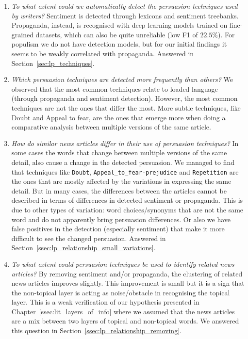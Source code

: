 \begin{enumerate}[label={\textbf{RQ2.\arabic*:}},leftmargin=2cm]
    \item \emph{To what extent could we automatically detect the persuasion techniques used by writers?} Sentiment is detected through lexicons and sentiment treebanks. Propaganda, instead, is recognised with deep learning models trained on fine-grained datasets, which can also be quite unreliable (low F1 of $22.5\%$). For populism we do not have detection models, but for our initial findings it seems to be weakly correlated with propaganda. Answered in Section~\ref{sec:lp_techniques}. 
    \item \emph{Which persuasion techniques are detected more frequently than others?} We observed that the most common techniques relate to loaded language (through propaganda and sentiment detection). However, the most common techniques are not the ones that differ the most. More subtle techniques, like Doubt and Appeal to fear, are the ones that emerge more when doing a comparative analysis between multiple versions of the same article.
    \item \emph{How do similar news articles differ in their use of persuasion techniques?} In some cases the words that change between multiple versions of the same detail, also cause a change in the detected persuasion. We managed to find that techniques like \texttt{Doubt}, \texttt{Appeal\_to\_fear-prejudice} and \texttt{Repetition} are the ones that are mostly affected by the variations in expressing the same detail. But in many cases, the differences between the articles cannot be described in terms of differences in detected sentiment or propaganda. This is due to other types of variation: word choices/synonyms that are not the same word and do not apparently bring persuasion differences. Or also we have false positives in the detection (especially sentiment) that make it more difficult to see the changed persuasion. Answered in Section~\ref{ssec:lp_relationship_small_variations}.
    \item \emph{To what extent could persuasion techniques be used to identify related news articles?} By removing sentiment and/or propaganda, the clustering of related news articles improves slightly. This improvement is small but it is a sign that the non-topical layer is acting as noise/obstacle in recognising the topical layer. This is a weak verification of our hypothesis presented in Chapter~\ref{ssec:lit_layers_of_info} where we assumed that the news articles are a mix between two layers of topical and non-topical words.  We answered this question in Section~\ref{ssec:lp_relationship_removing}.
\end{enumerate}

